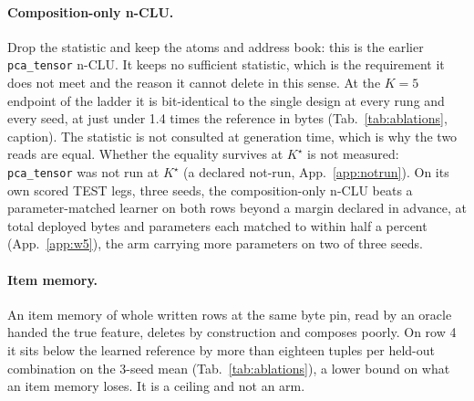 \documentclass{article} %
\newcommand{\Kstar}{\ensuremath{K^{\star}}}
\begin{document}
\paragraph{Composition-only n-CLU.} Drop the statistic and keep the
atoms and address book: this is the earlier \texttt{pca\_tensor} n-CLU. It keeps no sufficient
statistic, which is the requirement it does not meet and the reason it cannot delete in this sense. At the
$K=5$ endpoint of the ladder it is bit-identical to the single design at every rung and every
seed, at just under 1.4 times the reference in bytes (Tab.~\ref{tab:ablations}, caption).
The statistic is not consulted at generation time, which is why the two reads are equal.
Whether the equality survives at $\Kstar$ is not measured: \texttt{pca\_tensor} was not run at
$\Kstar$ (a declared not-run, App.~\ref{app:notrun}).
On its own scored TEST legs, three seeds, the composition-only n-CLU beats a parameter-matched
learner on both rows beyond a margin declared in advance, at total deployed bytes and parameters each matched to
within half a percent (App.~\ref{app:w5}), the arm carrying more parameters on two of three seeds.

\paragraph{Item memory.} An item memory of whole written rows at
the same byte pin, read by an oracle handed the true feature, deletes by construction and
composes poorly. On row 4 it sits below the learned
reference by more than eighteen tuples per held-out combination on the 3-seed mean (Tab.~\ref{tab:ablations}), a lower bound on what an item memory
loses. It is a ceiling and not an arm. %
\end{document}
